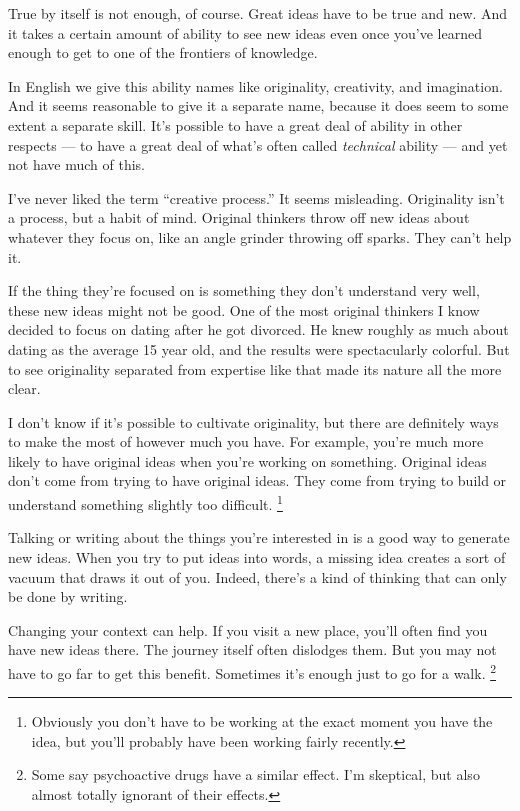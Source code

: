 \documentclass[12pt]{book}
\begin{document}
True by itself is not enough, of course. Great ideas have to be true and
new. And it takes a certain amount of ability to see new ideas even once
you've learned enough to get to one of the frontiers of knowledge.

In English we give this ability names like originality, creativity, and
imagination. And it seems reasonable to give it a separate name, because
it does seem to some extent a separate skill. It's possible to have a
great deal of ability in other respects --- to have a great deal of
what's often called \emph{technical} ability --- and yet not have much
of this.

I've never liked the term ``creative process.'' It seems misleading.
Originality isn't a process, but a habit of mind. Original thinkers
throw off new ideas about whatever they focus on, like an angle grinder
throwing off sparks. They can't help it.

If the thing they're focused on is something they don't understand very
well, these new ideas might not be good. One of the most original
thinkers I know decided to focus on dating after he got divorced. He
knew roughly as much about dating as the average 15 year old, and the
results were spectacularly colorful. But to see originality separated
from expertise like that made its nature all the more clear.

I don't know if it's possible to cultivate originality, but there are
definitely ways to make the most of however much you have. For example,
you're much more likely to have original ideas when you're working on
something. Original ideas don't come from trying to have original ideas.
They come from trying to build or understand something slightly too
difficult. \footnote{Obviously you don't have to be working at the exact moment you
have the idea, but you'll probably have been working fairly recently.}

Talking or writing about the things you're interested in is a good way
to generate new ideas. When you try to put ideas into words, a missing
idea creates a sort of vacuum that draws it out of you. Indeed, there's
a kind of thinking that can only be done by writing.

Changing your context can help. If you visit a new place, you'll often
find you have new ideas there. The journey itself often dislodges them.
But you may not have to go far to get this benefit. Sometimes it's
enough just to go for a walk. \footnote{Some say psychoactive drugs have a similar effect. I'm
skeptical, but also almost totally ignorant of their effects.}
\end{document}
